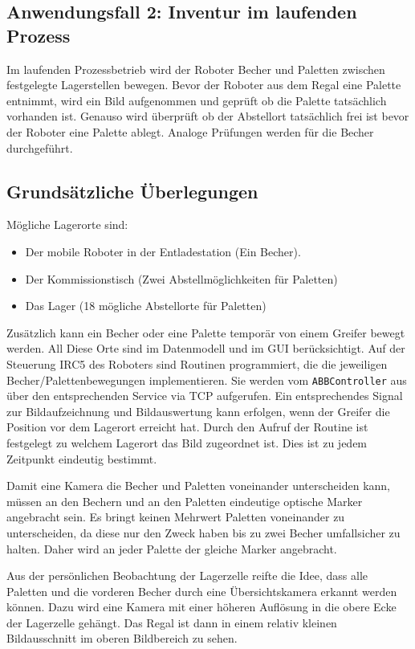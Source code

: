     \subsection{Anwendungsfall 2: Inventur im laufenden Prozess}\label{InventurImProzess}

    Im laufenden Prozessbetrieb wird der Roboter Becher und Paletten zwischen festgelegte Lagerstellen bewegen.
    Bevor der Roboter aus dem Regal eine Palette entnimmt, wird ein Bild aufgenommen und geprüft ob die Palette tatsächlich vorhanden ist.
    Genauso wird überprüft ob der Abstellort tatsächlich frei ist bevor der Roboter eine Palette ablegt.
    Analoge Prüfungen werden für die Becher durchgeführt.

    \subsection{Grundsätzliche Überlegungen}
    Mögliche Lagerorte sind:
    \begin{itemize}
        \item Der mobile Roboter in der Entladestation (Ein Becher). 
        \item Der Kommissionstisch (Zwei Abstellmöglichkeiten für Paletten)
        \item Das Lager (18 mögliche Abstellorte für Paletten)
    \end{itemize}
    Zusätzlich kann ein Becher oder eine Palette temporär von einem Greifer bewegt werden. 
    All Diese Orte sind im Datenmodell und im GUI berücksichtigt. 
    Auf der Steuerung IRC5 des Roboters sind Routinen programmiert, die die jeweiligen Becher/Palettenbewegungen implementieren.
    Sie werden vom \verb|ABBController| aus über den entsprechenden Service via TCP aufgerufen. 
    Ein entsprechendes Signal zur Bildaufzeichnung und Bildauswertung kann erfolgen, wenn der Greifer die Position vor dem Lagerort erreicht hat. 
    Durch den Aufruf der Routine ist festgelegt zu welchem Lagerort das Bild zugeordnet ist.
    Dies ist zu jedem Zeitpunkt eindeutig bestimmt. 

    Damit eine Kamera die Becher und Paletten voneinander unterscheiden kann, müssen an den Bechern und an den Paletten eindeutige optische Marker angebracht sein. 
    Es bringt keinen Mehrwert Paletten voneinander zu unterscheiden, da diese nur den Zweck haben bis zu zwei Becher umfallsicher zu halten. 
    Daher wird an jeder Palette der gleiche Marker angebracht.

    Aus der persönlichen Beobachtung der Lagerzelle reifte die Idee, dass alle Paletten und die vorderen Becher durch eine Übersichtskamera erkannt werden können. 
    Dazu wird eine Kamera mit einer höheren Auflösung in die obere Ecke der Lagerzelle gehängt. 
    Das Regal ist dann in einem relativ kleinen Bildausschnitt im oberen Bildbereich zu sehen. 

